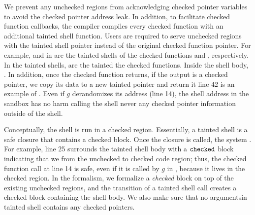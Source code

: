 % 
We prevent any unchecked regions from acknowledging checked pointer variables to
avoid the checked pointer address leak.  In addition, to facilitate checked
function callbacks, the \systemname{} compiler compiles every checked function
with an additional tainted shell function.  Users are required to serve
unchecked regions with the tainted shell pointer instead of the original checked
function pointer.  For example,  and
 in  are the tainted
shells of the checked functions  and ,
respectively.  In the tainted shells,  
are the tainted   the  checked functions.
% 
Inside the shell body,   .  
% 
In addition, once the checked function returns, if the output is a checked
pointer, we copy its data to a new tainted pointer and return it 
   line 42 is an example of  .  Even if $g$
  derandomizes its address (line 14), the shell address  in the sandbox
   has no harm   calling the shell never
    any checked pointer information outside of the
  shell.
% 

% 
Conceptually, the shell is run in a checked region.  Essentially, a tainted
shell is a safe closure that contains a checked block.  Once the closure is
called, the system  .  For example,  line 25 surrounds
the tainted shell body with a $\mathtt{checked}$ block indicating that we
  from
the unchecked to checked code region; thus, the checked function call at
 line 14 is safe, even if it is called by $g$ in
, because it lives in the checked region.  In the
\systemname{} formalism, we formalize a \textit{checked} block on top of the
existing unchecked regions, and the transition of a tainted shell call creates a
checked block containing the shell body.  We also make sure that no
argumentsin   tainted shell
contains any checked pointers.
%

